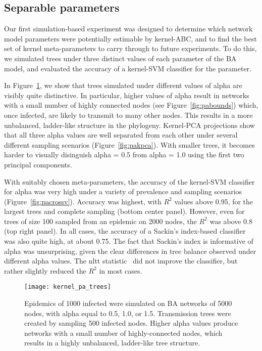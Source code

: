 \subsection{Separable parameters}

Our first simulation-based experiment was designed to determine which network
model parameters were potentially estimable by kernel-ABC, and to find the best
set of kernel meta-parameters to carry through to future experiments. To do
this, we simulated trees under three distinct values of each parameter of the
\gls{BA} model, and evaluated the accuracy of a kernel-\gls{SVM} classifier for
the parameter.

In Figure~\ref{fig:patrees}, we show that trees simulated under different
values of \gls{alpha} are visibly quite distinctive. In particular, higher
values of \gls{alpha} result in networks with a small number of highly
connected nodes (see Figure~\ref{fig:pabounds}) which, once infected, are
likely to transmit to many other nodes. This results in a more unbalanced,
ladder-like structure in the phylogeny. Kernel-\gls{PCA} projections show that
all three \gls{alpha} values are well separated from each other under several
different sampling scenarios (Figure~\ref{fig:pakpca}). With smaller trees,
it becomes harder to visually disinguish \gls{alpha} = 0.5 from \gls{alpha} =
1.0 using the first two principal components.

With suitably chosen meta-parameters, the accuracy of the kernel-\gls{SVM}
classifier for \gls{alpha} was very high under a variety of prevalence and
sampling scenarios (Figure~\ref{fig:pacrossv}). Accuracy was highest, with
$R^2$ values above 0.95, for the largest trees and complete sampling (bottom
center panel). However, even for trees of size 100 sampled from an epidemic on
2000 nodes, the $R^2$ was above 0.8 (top right panel). In all cases, the
accuracy of a Sackin's index-based classifier was also quite high, at about
0.75. The fact that Sackin's index is informative of \gls{alpha} was
unsurprising, given the clear differences in tree balance observed under
different \gls{alpha} values. The \gls{nltt}
statistic~\autocite{janzen2015approximate} did not improve the classifier, but
rather slightly reduced the $R^2$ in most cases. 

\begin{figure}[ht]
  \centering
  \label{fig:patrees}
  \texttt{[image: kernel\_pa\_trees]}
  \caption[Visibly distinctive trees simulated under three values of \gls{alpha}]{
    Epidemics of 1000 infected were simulated on \gls{BA} networks of 5000
    nodes, with \gls{alpha} equal to 0.5, 1.0, or 1.5. Transmission trees were
    created by sampling 500 infected nodes. Higher \gls{alpha} values produce
    networks with a small number of highly-connected nodes, which results in a
    highly unbalanced, ladder-like tree structure.
  }
\end{figure}

